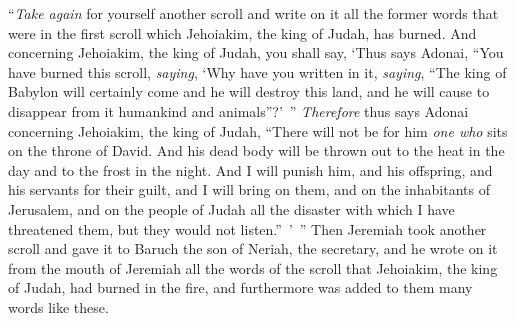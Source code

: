 \begin{biblechapter}
\verse “\textit{Take again} for yourself another scroll and write on it all the former words that were in the first scroll which Jehoiakim, the king of Judah, has burned.
\verse And concerning Jehoiakim, the king of Judah, you shall say, ‘Thus says Adonai, “You have burned this scroll, \textit{saying}, ‘Why have you written in it, \textit{saying}, “The king of Babylon will certainly come and he will destroy this land, and he will cause to disappear from it humankind and animals”?’ ”
\verse \textit{Therefore} thus says Adonai concerning Jehoiakim, the king of Judah, “There will not be for him \textit{one who} sits on the throne of David. And his dead body will be thrown out to the heat in the day and to the frost in the night.
\verse And I will punish him, and his offspring, and his servants for their guilt, and I will bring on them, and on the inhabitants of Jerusalem, and on the people of Judah all the disaster with which I have threatened them, but they would not listen.” ’ ”
\verse Then Jeremiah took another scroll and gave it to Baruch the son of Neriah, the secretary, and he wrote on it from the mouth of Jeremiah all the words of the scroll that Jehoiakim, the king of Judah, had burned in the fire, and furthermore was added to them many words like these.
\end{biblechapter}

